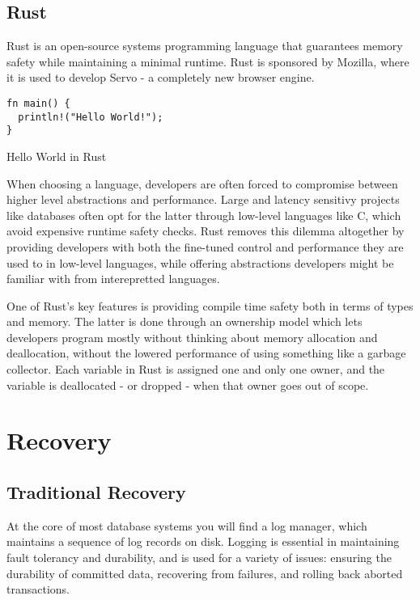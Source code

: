 \documentclass[b5paper]{report}
\begin{document}
\section{Rust}
Rust \cite{rust} is an open-source systems programming language that guarantees memory
safety while maintaining a minimal runtime. Rust is sponsored by Mozilla, where
it is used to develop Servo - a completely new browser engine.

\begin{listing}
  \begin{verbatim}
fn main() {
  println!("Hello World!");
}
  \end{verbatim}
  \caption{Hello World in Rust}
\end{listing}

When choosing a language, developers are often forced to compromise between
higher level abstractions and performance. Large and latency sensitivy projects
like databases often opt for the latter through low-level languages like C,
which avoid expensive runtime safety checks. Rust removes this dilemma
altogether by providing developers with both the fine-tuned control and
performance they are used to in low-level languages, while offering abstractions
developers might be familiar with from interepretted languages.

One of Rust's key features is providing compile time safety both in terms of
types and memory. The latter is done through an ownership model which lets
developers program mostly without thinking about memory allocation and
deallocation, without the lowered performance of using something like a garbage
collector. Each variable in Rust is assigned one and only one owner, and the
variable is deallocated - or dropped - when that owner goes out of scope.

\chapter{Recovery}
\section{Traditional Recovery}
At the core of most database systems you will find a log manager, which
maintains a sequence of log records on disk. Logging is essential in maintaining
fault tolerancy and durability, and is used for a variety of issues: ensuring
the durability of committed data, recovering from failures, and rolling back
aborted transactions.
\end{document}
